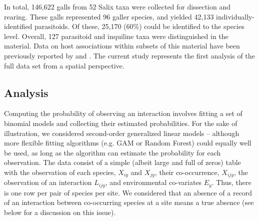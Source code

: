 \documentclass[12pt]{article}
\begin{document}
In total, 146,622 galls from 52 Salix taxa were collected for dissection and
rearing. These galls represented 96 galler species, and yielded 42,133
individually-identified parasitoids. Of these, 25,170 (60\%) could be
identified to the species level. Overall, 127 parasitoid and inquiline taxa were
distinguished in the material. Data on host associations within subsets of
this material have been previously reported by \citep{Kopelke1999} and
\citep{Nyman2007}. The current study represents the first analysis of
the full data set from a spatial perspective.

\subsection*{Analysis}

Computing the probability of observing an interaction involves fitting a set
of binomial models and collecting their estimated probabilities. For the sake
of illustration, we considered second-order generalized linear models –
although more flexible fitting algorithms (e.g. GAM or Random Forest)
could equally well be used, as long as the algorithm can estimate the
probability for each observation. The data consist of a simple (albeit large
and full of zeros) table with the observation of each species, $X_{iy}$ and $X_{jy}$,
their co-occurrence, $X_{ijy}$, the observation of an interaction $L_{ijy}$, and
environmental co-variates $E_y$. Thus, there is one row per pair of species per
site. We considered that an absence of a record of an interaction between co-occurring
species at a site means a true absence (see below for a discussion
on this issue).
\end{document}
